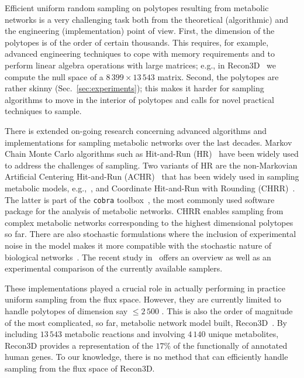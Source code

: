    Efficient uniform random sampling on polytopes resulting from metabolic
   networks is a very challenging task  both from the theoretical (algorithmic)
   and the engineering (implementation)  point of view.
   First, the dimension of the polytopes is of the order of certain thousands. This
   requires, for example, advanced engineering techniques to cope with memory
   requirements and to perform linear algebra operations with large matrices;
   e.g., in
   Recon3D~\citep{brunk2018recon3d} we compute the null space of a
   $8\,399 \times 13\,543$ matrix. Second, the polytopes are rather skinny
   (Sec.~\ref{sec:experiments}); this makes it harder for sampling algorithms to
   move in the interior of polytopes and calls for novel practical techniques to
   sample.

   There is extended on-going research concerning advanced algorithms and
   implementations for sampling metabolic networks over the last decades. Markov
   Chain Monte Carlo algorithms such as Hit-and-Run (HR)~\citep{smith84} have been
   widely used to address the challenges of sampling. Two variants of HR are the
   non-Markovian Artificial Centering Hit-and-Run
   (ACHR)~\citep{kaufman1998direction} that has been widely used in sampling
   metabolic models, e.g.,~\citep{Saa16}, and Coordinate Hit-and-Run with Rounding
   (CHRR)~\citep{haraldsdottir2017chrr}. 
   The latter is part of the \texttt{cobra} toolbox~\citep{heirendt2019creation}, the most commonly used software package for the analysis of metabolic networks. 
   CHRR enables sampling from complex metabolic
   networks corresponding to the highest dimensional polytopes so far. There are
   also stochastic formulations where the inclusion of experimental noise in the
   model makes it more compatible with the stochastic nature of biological
   networks~\citep{MacGillivray17}. The recent study in~\citep{fallahi2020comparison}
   offers an overview as well as an experimental comparison of the currently
   available samplers.

   These implementations played a crucial role in actually performing in practice
   uniform sampling from the flux space. However, they are currently limited to
   handle polytopes of dimension say $\leq 2\, 500$ \citep{fallahi2020comparison,
   haraldsdottir2017chrr}. This is also the order of magnitude of the most
   complicated, so far, metabolic network model built,
   Recon3D~\citep{brunk2018recon3d}. By including $13\,543$ metabolic reactions and
   involving $4 \,140$ unique metabolites, Recon3D provides a representation of the
   $17\%$ of the functionally of annotated human genes. To our knowledge, there is
   no method that can efficiently handle sampling from the flux space of Recon3D.

